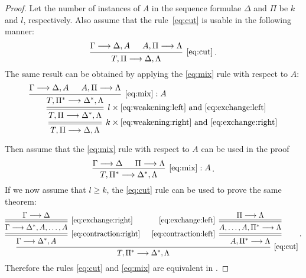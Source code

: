 \documentclass[11pt,a4paper]{article}
\begin{document}
\begin{proof}
    Let the number of instances of \(A\) in the sequence
    formulae \(\Delta\) and \(\Pi\) be \(k\) and \(l\),
    respectively. Also assume that the rule~\eqref{eq:cut}
    is usable in the following manner:
    \begin{equation*}
        \begin{prooftree}
            \hypo{\Gamma\seq\Delta, A}
            \hypo{A, \Pi\seq\Lambda}
            \infer2[\eqref{eq:cut}]{T,\Pi\seq\Delta,\Lambda}
        \end{prooftree}\,.
    \end{equation*}
    The same result can be obtained by applying the \eqref{eq:mix} rule with respect to \(A\):
    \begin{equation*}
        \begin{prooftree}
            \hypo{\Gamma\seq\Delta, A}
            \hypo{A, \Pi\seq\Lambda}
            \infer2[\(\eqref{eq:mix}:A\)]{T,\Pi^\ast\seq\Delta^\ast,\Lambda}
            \infer[rule style=double]1[\(l\times\eqref{eq:weakening:left}\) and \eqref{eq:exchange:left}]{
                T,\Pi\seq\Delta^\ast,\Lambda
            }
            \infer[rule style=double]1[\(k\times\eqref{eq:weakening:right}\) and \eqref{eq:exchange:right}]{
                T,\Pi\seq\Delta,\Lambda
            }
        \end{prooftree}
    \end{equation*}

    Then assume that the \eqref{eq:mix} rule with respect to \(A\) can be used in the proof
    \begin{equation*}
        \begin{prooftree}
            \hypo{\Gamma\seq\Delta}
            \hypo{\Pi\seq\Lambda}
            \infer2[\(\eqref{eq:mix}:A\)]{T,\Pi^\ast\seq\Delta^\ast,\Lambda}
        \end{prooftree} \,.
    \end{equation*}
    If we now assume that \(l\geq k\), the \eqref{eq:cut} rule can be used to prove the same theorem:
    \begin{equation*}
        \begin{prooftree}
            \hypo{\Gamma\seq\Delta}
            \infer[rule style=double]1[\eqref{eq:exchange:right}]{\Gamma\seq\Delta^\ast, A,\ldots, A}
            \infer[rule style=double]1[\eqref{eq:contraction:right}]{\Gamma\seq\Delta^\ast, A}
            \hypo{\Pi\seq\Lambda}
            \infer[rule style=double,left label=\eqref{eq:exchange:left}]1{A,\ldots,A,\Pi^\ast\seq\Lambda}
            \infer[rule style=double,left label=\eqref{eq:contraction:left}]1{A,\Pi^\ast\seq\Lambda}
            \infer2[\eqref{eq:cut}]{T,\Pi^\ast\seq\Delta^\ast,\Lambda}
        \end{prooftree}\,.
    \end{equation*}
    Therefore the rules \eqref{eq:cut} and \eqref{eq:mix} are equivalent in \LK.
\end{proof}
\end{document}

